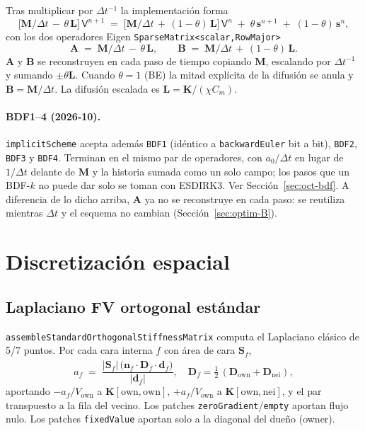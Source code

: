 \documentclass[11pt,a4paper]{article}
\newcommand{\code}[1]{\texttt{\small #1}}
\newcommand{\Dten}{\mathbf{D}}
\newcommand{\Mmass}{\mathbf{M}}
\newcommand{\Kstif}{\mathbf{K}}
\newcommand{\Lop}{\mathbf{L}}
\newcommand{\Aimp}{\mathbf{A}}
\newcommand{\Bimp}{\mathbf{B}}
\begin{document}
Tras multiplicar por $\Delta t^{-1}$ la implementación forma
\begin{equation}
  \bigl[\Mmass/\Delta t \,-\, \theta\, \Lop\bigr]\, \mathsf{V}^{n+1}
   \;=\;
   \bigl[\Mmass/\Delta t \,+\, (1-\theta)\, \Lop\bigr]\, \mathsf{V}^{n}
   \;+\; \theta\, \mathbf{s}^{n+1}
   \;+\; (1-\theta)\, \mathbf{s}^{n},
   \label{eq:implicit-system}
\end{equation}
con los dos operadores Eigen \code{SparseMatrix<scalar,RowMajor>}
\begin{equation}
  \Aimp \;=\; \Mmass/\Delta t \,-\, \theta\, \Lop,
   \qquad
  \Bimp \;=\; \Mmass/\Delta t \,+\, (1-\theta)\, \Lop.
   \label{eq:AB}
\end{equation}
$\Aimp$ y $\Bimp$ se reconstruyen en cada paso de tiempo copiando $\Mmass$,
escalando por $\Delta t^{-1}$ y sumando $\pm \theta \Lop$. Cuando
$\theta = 1$ (BE) la mitad explícita de la difusión se anula y
$\Bimp = \Mmass/\Delta t$. La difusión escalada es
$\Lop = \Kstif / (\chi C_{m})$.

\paragraph{BDF1--4 (2026-10).} \code{implicitScheme} acepta además \code{BDF1}
(idéntico a \code{backwardEuler} bit a bit), \code{BDF2}, \code{BDF3} y
\code{BDF4}. Terminan en el mismo par de operadores, con $a_0/\Delta t$ en lugar
de $1/\Delta t$ delante de $\Mmass$ y la historia sumada como un solo campo; los
pasos que un BDF-$k$ no puede dar solo se toman con ESDIRK3. Ver
Sección~\ref{sec:oct-bdf}. A diferencia de lo dicho arriba, $\Aimp$ ya no se
reconstruye en cada paso: se reutiliza mientras $\Delta t$ y el esquema no
cambian (Sección~\ref{sec:optim-B}).

\section{Discretización espacial}

\subsection{Laplaciano FV ortogonal estándar}

\code{assembleStandardOrthogonalStiffnessMatrix} computa el Laplaciano clásico de
5/7 puntos. Por cada cara interna $f$ con área de cara $\mathbf{S}_{f}$,
\begin{equation}
  a_{f} \;=\;
   \frac{ \lvert \mathbf{S}_{f} \rvert\,
          \bigl( \mathbf{n}_{f} \cdot \Dten_{f} \cdot \hat{\mathbf{d}}_{f} \bigr) }
        { \lvert \mathbf{d}_{f} \rvert },
   \quad
   \Dten_{f} = \tfrac{1}{2}\,(\Dten_{\text{own}} + \Dten_{\text{nei}}),
\end{equation}
aportando $-a_{f}/V_{\text{own}}$ a $\Kstif[\text{own},\text{own}]$,
$+a_{f}/V_{\text{own}}$ a $\Kstif[\text{own},\text{nei}]$, y el par transpuesto a
la fila del vecino. Los patches \code{zeroGradient}/\code{empty} aportan flujo
nulo. Los patches \code{fixedValue} aportan solo a la diagonal del dueño (owner).
\end{document}
